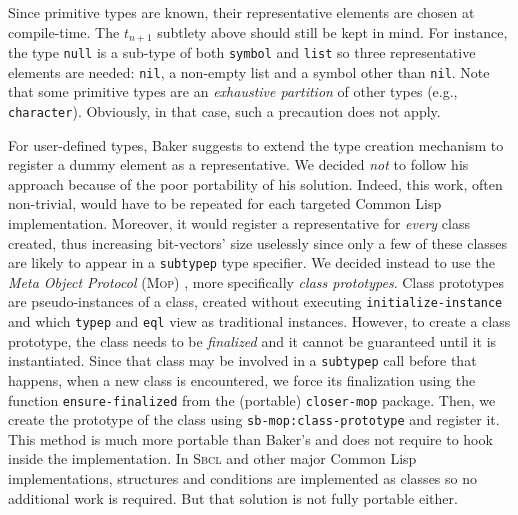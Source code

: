 \documentclass[format=sigconf]{acmart}
\newcommand\code[2][\small]{\sloppy\texttt{#1#2}}
\theoremstyle{definition}
\newcommand\sbcl{\textsc{Sbcl}}
\begin{document}
Since primitive types are known, their representative elements are chosen at
compile-time. The $t_{n+1}$ subtlety above should still be kept in mind. For
instance, the type \code{null} is a sub-type of both \code{symbol} and
\code{list} so three representative elements are needed: \code{nil}, a non-empty
list and a symbol other than \code{nil}. Note that some primitive types are an
\emph{exhaustive partition} of other types (e.g., \code{character}).
Obviously, in that case, such a precaution does not apply.

For user-defined types, Baker suggests to extend the type creation mechanism to
register a dummy element as a representative. We decided \emph{not} to follow
his approach because of the poor portability of his solution. Indeed, this
work, often non-trivial, would have to be repeated for each targeted Common Lisp
implementation. Moreover, it would register a representative for \emph{every}
class created, thus increasing bit-vectors' size uselessly since only a few of
these classes are likely to appear in a \code{subtypep} type specifier.
We decided instead to use the \emph{Meta Object Protocol} (\textsc{Mop})
\cite{bib:kiczales.91.book}, more specifically \emph{class prototypes}. Class
prototypes are pseudo-instances of a class, created without executing
\code{initialize-instance} and which \code{typep} and \code{eql} view as traditional
instances. However, to create a class prototype, the class needs to be
\emph{finalized} and it cannot be guaranteed until it is instantiated.
Since that class may be involved in a \code{subtypep} call before that happens,
when a new class is encountered, we force its finalization using the function
\code{ensure-finalized} from the (portable) \code{closer-mop} package.
Then, we create the prototype of the class using \code{sb-mop:class-prototype}
and register it. This method is much more portable than Baker's and does not
require to hook inside the implementation. In \sbcl{} and other major Common
Lisp implementations, structures and conditions are implemented as classes so no
additional work is required. But that solution is not fully portable either.
\end{document}
